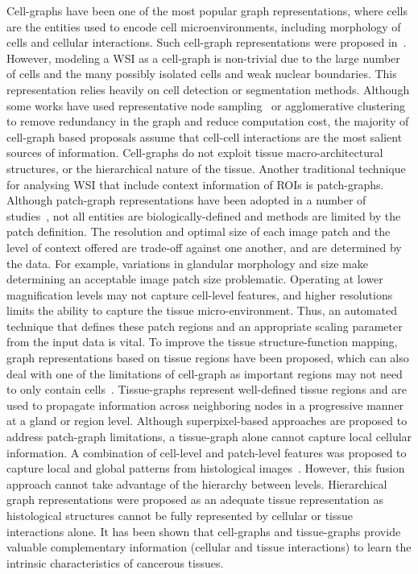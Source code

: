 Cell-graphs have been one of the most popular graph representations, where cells are the entities used to encode cell microenvironments, including morphology of cells and cellular interactions. Such cell-graph representations were proposed in~. However, modeling a WSI as a cell-graph is non-trivial due to the large number of cells and the many possibly isolated cells and weak nuclear boundaries. This representation relies heavily on cell detection or segmentation methods. 
Although some works have used representative node sampling{~} or agglomerative clustering{~} to remove redundancy in the graph and reduce computation cost, the majority of cell-graph based proposals assume that cell-cell interactions are the most salient sources of information. Cell-graphs do not exploit tissue macro-architectural structures, or the hierarchical nature of the tissue.
Another traditional technique for analysing WSI that include context information of ROIs is patch-graphs. Although patch-graph representations have been adopted in a number of studies~, not all entities are biologically-defined and methods are limited by the patch definition. The resolution and optimal size of each image patch and the level of context offered are trade-off against one another, and are determined by the data. For example, variations in glandular morphology and size make determining an acceptable image patch size problematic. Operating at lower magnification levels may not capture cell-level features, and higher resolutions limits the ability to capture the tissue micro-environment. Thus, an automated technique that defines these patch regions and an appropriate scaling parameter from the input data is vital. 
To improve the tissue structure-function mapping, graph representations based on tissue regions have been proposed, which can also deal with one of the limitations of cell-graph as important regions may not need to only contain cells~. Tissue-graphs represent well-defined tissue regions and are used to propagate information across neighboring nodes in a progressive manner at a gland or region level. Although superpixel-based approaches are proposed to address patch-graph limitations, a tissue-graph alone cannot capture local cellular information.
A combination of cell-level and patch-level features was proposed to capture local and global patterns from histological images{~}. However, this fusion approach cannot take advantage of the hierarchy between levels.
Hierarchical graph representations were proposed as an adequate tissue representation as histological structures cannot be fully represented by cellular or tissue interactions alone. It has been shown that cell-graphs and tissue-graphs provide valuable complementary information (cellular and tissue interactions) to learn the intrinsic characteristics of cancerous tissues.
